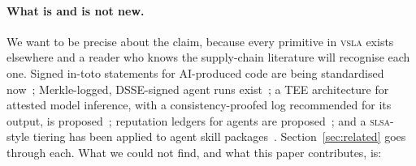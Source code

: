 \documentclass[11pt]{article}
\newcommand{\vsla}{\textsc{vsla}}
\newcommand{\slsa}{\textsc{slsa}}
\begin{document}
\paragraph{What is and is not new.}
We want to be precise about the claim, because every primitive in \vsla{} exists elsewhere and a reader who
knows the supply-chain literature will recognise each one. Signed in-toto statements for AI-produced code are
being standardised now~\cite{intoto604,attestproj}; Merkle-logged, DSSE-signed agent runs exist~\cite{flightrecorder,novafabric,vct};
a TEE architecture for attested model inference, with a consistency-proofed log recommended for its output, is proposed~\cite{teegrant}; reputation
ledgers for agents are proposed~\cite{agentreputation,zer0n}; and a \slsa{}-style tiering has been applied to
agent skill packages~\cite{skillslsa}. Section~\ref{sec:related} goes through each. What we could not find, and
what this paper contributes, is:
\end{document}
